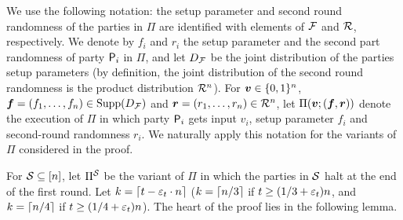 We use the following notation: the setup parameter and second round randomness of the parties in $\Pi$ are identified with elements of $\mathcal{F}$ and $\mathcal{R}$, respectively. We denote by $f_i$ and $r_i$ the setup parameter and the second part randomness of party $\mathsf{P}_i$ in $\Pi$, and let $D_{\cal F}$ be the joint distribution of the parties setup parameters (by definition, the joint distribution of the second round randomness is the product distribution $\mathcal{R}^n$). For ${ \boldsymbol{v}} \in {\{0,1\}^n}$, ${ \boldsymbol{f}}=(f_1,\ldots,f_n) \in \operatorname{Supp}(D_{\cal F})$ and ${ \boldsymbol{r}}=(r_1,\ldots,r_n) \in\mathcal{R}^n$, let $\Pi({ \boldsymbol{v}};({ \boldsymbol{f}},{ \boldsymbol{r}}))$ denote the execution of $\Pi$ in which party $\mathsf{P}_i$ gets input $v_i$, setup parameter $f_i$ and second-round randomness $r_i$. We naturally apply this notation for the variants of $\Pi$ considered in the proof.



For ${\cal{S}}\subseteq[n]$, let $\Pi^{\cal{S}}$ be the variant of $\Pi$ in which the parties in ${\cal{S}}$ halt at the end of the first round.   Let $k = \left\lceil {t-\varepsilon_t\cdot n} \right\rceil$ (\ie $k = \left\lceil n/3 \right\rceil$ if $t\ge (1/3 + \varepsilon_t)n$, and   $k = \left\lceil n/4 \right\rceil$ if $t\ge (1/4 + \varepsilon_t)n$).    The heart of the proof lies in the following  lemma.

